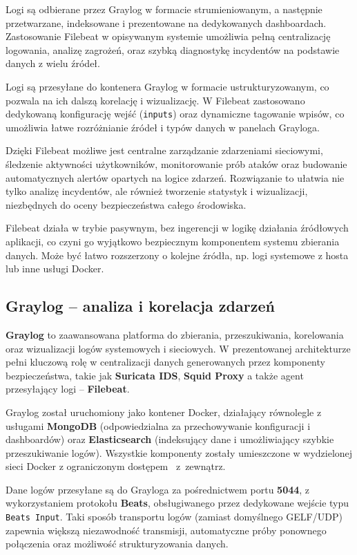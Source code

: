 \documentclass[
    left=2.5cm,         %
    right=2.5cm,        %
    top=2.5cm,          %
    bottom=3cm,         %
    bindingoffset=6mm,  %
    nohyphenation=true %
]{eiti/eiti-thesis} %
\begin{document}
Logi są odbierane przez Graylog w formacie strumieniowanym, a następnie przetwarzane, indeksowane i prezentowane na dedykowanych dashboardach. Zastosowanie Filebeat 
w opisywanym systemie umożliwia pełną centralizację logowania, analizę zagrożeń, oraz szybką diagnostykę incydentów na podstawie danych z wielu źródeł.



Logi są przesyłane do kontenera Graylog w formacie ustrukturyzowanym, co pozwala na ich dalszą korelację i wizualizację. W Filebeat zastosowano dedykowaną konfigurację wejść (\texttt{inputs}) oraz dynamiczne tagowanie wpisów, co umożliwia łatwe rozróżnianie źródeł i typów danych w panelach Grayloga.

Dzięki Filebeat możliwe jest centralne zarządzanie zdarzeniami sieciowymi, śledzenie aktywności użytkowników, monitorowanie prób ataków oraz budowanie automatycznych alertów opartych na logice zdarzeń. Rozwiązanie to ułatwia nie tylko analizę incydentów, ale również tworzenie statystyk i wizualizacji, niezbędnych do oceny bezpieczeństwa całego środowiska.

Filebeat działa w trybie pasywnym, bez ingerencji w logikę działania źródłowych aplikacji, co czyni go wyjątkowo bezpiecznym komponentem systemu zbierania danych. Może być łatwo rozszerzony o kolejne źródła, np. logi systemowe z hosta lub inne usługi Docker.

\subsection{Graylog – analiza i korelacja zdarzeń}

\textbf{Graylog}\cite{graylog-docs} to zaawansowana platforma do zbierania, przeszukiwania, korelowania oraz wizualizacji logów systemowych i sieciowych. 
W prezentowanej architekturze pełni kluczową rolę w centralizacji danych generowanych przez komponenty bezpieczeństwa, takie jak \textbf{Suricata IDS}, \textbf{Squid Proxy} a także agent przesyłający logi – \textbf{Filebeat}.

Graylog został uruchomiony jako kontener Docker, działający równolegle z usługami \textbf{MongoDB} (odpowiedzialna za przechowywanie konfiguracji i dashboardów) 
oraz \textbf{Elasticsearch} (indeksujący dane i umożliwiający szybkie przeszukiwanie logów). Wszystkie komponenty zostały umieszczone w wydzielonej sieci Docker 
z ograniczonym dostępem ~z~zewnątrz.

Dane logów przesyłane są do Grayloga za pośrednictwem portu \textbf{5044}, z wykorzystaniem protokołu \textbf{Beats}, obsługiwanego przez dedykowane wejście typu \texttt{Beats Input}. Taki sposób transportu logów (zamiast domyślnego GELF/UDP) zapewnia większą niezawodność transmisji, automatyczne próby ponownego połączenia oraz możliwość strukturyzowania danych.
\end{document}
